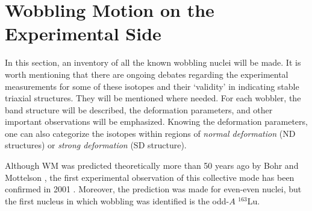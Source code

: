 \section{Wobbling Motion on the Experimental Side}

In this section, an inventory of all the known wobbling nuclei will be made. It is worth mentioning that there are ongoing debates regarding the experimental measurements for some of these isotopes and their `validity' in indicating stable triaxial structures. They will be mentioned where needed. For each wobbler, the band structure will be described, the deformation parameters, and other important observations will be emphasized. Knowing the deformation parameters, one can also categorize the isotopes within regions of \emph{normal deformation} (ND structures) or \emph{strong deformation} (SD structure).

Although WM was predicted theoretically more than 50 years ago by Bohr and Mottelson \cite{bohr1998nuclear}, the first experimental observation of this collective mode has been confirmed in 2001 \cite{odegaard2001evidence}. Moreover, the prediction was made for even-even nuclei, but the first nucleus in which wobbling was identified is the odd-$A$ $^{163}$Lu.